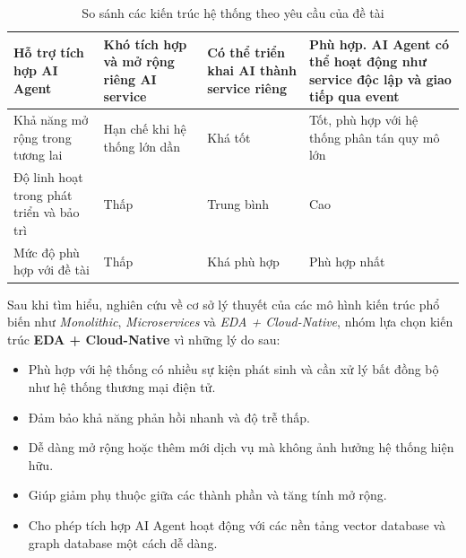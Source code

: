 \begin{table}[H]
\begin{tabularx}{\textwidth}{|p{4.5cm}|X|X|X|}
        Hỗ trợ tích hợp AI Agent                              &
        Khó tích hợp và mở rộng riêng AI service              &
        Có thể triển khai AI thành service riêng              &
        Phù hợp. AI Agent có thể hoạt động như service độc lập và giao tiếp qua event \\
        \hline

        Khả năng mở rộng trong tương lai                      &
        Hạn chế khi hệ thống lớn dần                          &
        Khá tốt                                               &
        Tốt, phù hợp với hệ thống phân tán quy mô lớn                                 \\
        \hline

        Độ linh hoạt trong phát triển và bảo trì              &
        Thấp                                                  &
        Trung bình                                            &
        Cao                                                                           \\
        \hline

        Mức độ phù hợp với đề tài                             &
        Thấp                                                  &
        Khá phù hợp                                           &
        Phù hợp nhất                                                                  \\
        \hline
    \end{tabularx}
    \caption{So sánh các kiến trúc hệ thống theo yêu cầu của đề tài}
    \label{tab:architecture-comparison}
\end{table}

Sau khi tìm hiểu, nghiên cứu về cơ sở lý thuyết của các mô hình kiến trúc phổ biến như \textit{Monolithic}, \textit{Microservices} và \textit{EDA + Cloud-Native}, nhóm lựa chọn kiến trúc \textbf{EDA + Cloud-Native} vì những lý do sau:
\begin{itemize}
    \item Phù hợp với hệ thống có nhiều sự kiện phát sinh và cần xử lý bất đồng bộ như hệ thống thương mại điện tử.
    \item Đảm bảo khả năng phản hồi nhanh và độ trễ thấp.
    \item Dễ dàng mở rộng hoặc thêm mới dịch vụ mà không ảnh hưởng hệ thống hiện hữu.
    \item Giúp giảm phụ thuộc giữa các thành phần và tăng tính mở rộng.
    \item Cho phép tích hợp AI Agent hoạt động với các nền tảng vector database và graph database một cách dễ dàng.
\end{itemize}









